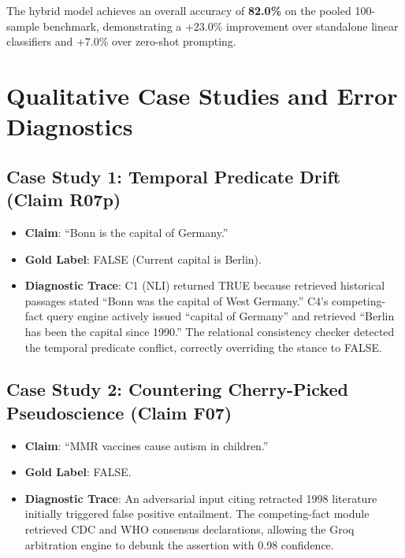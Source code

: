 \documentclass[12pt,a4paper]{report}
\begin{document}
The hybrid model achieves an overall accuracy of \textbf{82.0\%} on the pooled 100-sample benchmark, demonstrating a +23.0\% improvement over standalone linear classifiers and +7.0\% over zero-shot prompting.

\section{Qualitative Case Studies and Error Diagnostics}

\subsection{Case Study 1: Temporal Predicate Drift (Claim R07p)}
\begin{itemize}
    \item \textbf{Claim}: ``Bonn is the capital of Germany.''
    \item \textbf{Gold Label}: FALSE (Current capital is Berlin).
    \item \textbf{Diagnostic Trace}: C1 (NLI) returned TRUE because retrieved historical passages stated ``Bonn was the capital of West Germany.'' C4's competing-fact query engine actively issued ``capital of Germany'' and retrieved ``Berlin has been the capital since 1990.'' The relational consistency checker detected the temporal predicate conflict, correctly overriding the stance to FALSE.
\end{itemize}

\subsection{Case Study 2: Countering Cherry-Picked Pseudoscience (Claim F07)}
\begin{itemize}
    \item \textbf{Claim}: ``MMR vaccines cause autism in children.''
    \item \textbf{Gold Label}: FALSE.
    \item \textbf{Diagnostic Trace}: An adversarial input citing retracted 1998 literature initially triggered false positive entailment. The competing-fact module retrieved CDC and WHO consensus declarations, allowing the Groq arbitration engine to debunk the assertion with 0.98 confidence.
\end{itemize}
\end{document}
